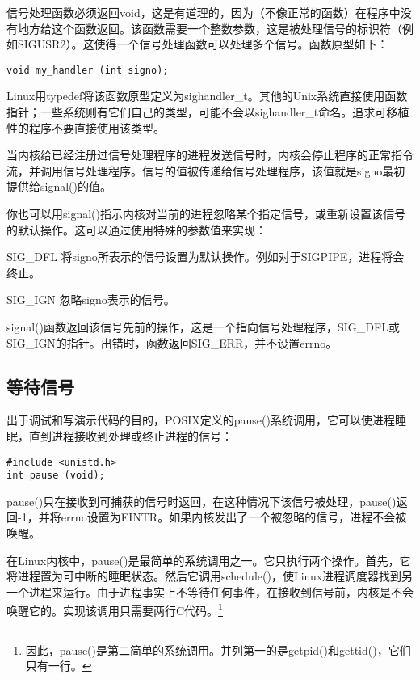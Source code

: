 信号处理函数必须返回void，这是有道理的，因为（不像正常的函数）在程序中没有地方给这个函数返回。该函数需要一个整数参数，这是被处理信号的标识符（例如SIGUSR2）。这使得一个信号处理函数可以处理多个信号。函数原型如下：

\begin{lstlisting}
void my_handler (int signo);
\end{lstlisting}

Linux用typedef将该函数原型定义为sighandler\_t。其他的Unix系统直接使用函数指针；一些系统则有它们自己的类型，可能不会以sighandler\_t命名。追求可移植性的程序不要直接使用该类型。

当内核给已经注册过信号处理程序的进程发送信号时，内核会停止程序的正常指令流，并调用信号处理程序。信号的值被传递给信号处理程序，该值就是signo最初提供给signal()的值。

你也可以用signal()指示内核对当前的进程忽略某个指定信号，或重新设置该信号的默认操作。这可以通过使用特殊的参数值来实现：

\begin{eqlist*}
\item[SIG\_DFL] 将signo所表示的信号设置为默认操作。例如对于SIGPIPE，进程将会终止。
\item[SIG\_IGN] 忽略signo表示的信号。
\end{eqlist*}

signal()函数返回该信号先前的操作，这是一个指向信号处理程序，SIG\_DFL或SIG\_IGN的指针。出错时，函数返回SIG\_ERR，并不设置errno。

\subsection{等待信号}

 出于调试和写演示代码的目的，POSIX定义的pause()系统调用，它可以使进程睡眠，直到进程接收到处理或终止进程的信号：

\begin{lstlisting}
#include <unistd.h>
int pause (void);
\end{lstlisting}

pause()只在接收到可捕获的信号时返回，在这种情况下该信号被处理，pause()返回-1，并将errno设置为EINTR。如果内核发出了一个被忽略的信号，进程不会被唤醒。

在Linux内核中，pause()是最简单的系统调用之一。它只执行两个操作。首先，它将进程置为可中断的睡眠状态。然后它调用schedule()，使Linux进程调度器找到另一个进程来运行。由于进程事实上不等待任何事件，在接收到信号前，内核是不会唤醒它的。实现该调用只需要两行C代码。\footnote[1]{因此，pause()是第二简单的系统调用。并列第一的是getpid()和gettid()，它们只有一行。}


